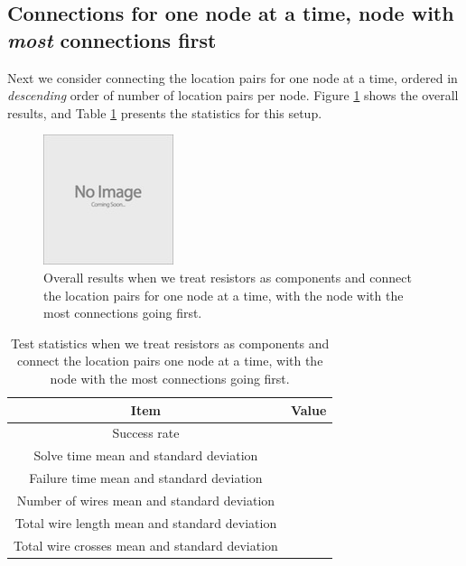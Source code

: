 \subsection{Connections for one node at a time, node with \textit{most}
connections first}

Next we consider connecting the location pairs for one node at a time, ordered
in \textit{descending} order of number of location pairs per node. Figure
\ref{fig:as_comp_node_d} shows the overall results, and Table
\ref{tb:as_comp_node_d} presents the statistics for this setup.

\begin{figure}[H]
\begin{center}
\includegraphics{Images/placeholder.jpg}
\caption{Overall results when we treat resistors as components and connect the
location pairs for one node at a time, with the node with the most connections
going first.}
\label{fig:as_comp_node_d}
\end{center}
\end{figure}

\begin{table}[H]
\begin{center}
\begin{singlespace}
\begin{tabular}{| c | c |}
\hline
Item & Value \\
\hline\hline
Success rate & \\
Solve time mean and standard deviation & \\
Failure time mean and standard deviation & \\
Number of wires mean and standard deviation & \\
Total wire length mean and standard deviation & \\
Total wire crosses mean and standard deviation & \\
\hline
\end{tabular}
\end{singlespace}
\end{center}
\label{tb:as_comp_node_d}
\caption{Test statistics when we treat resistors as components and connect the
location pairs one node at a time, with the node with the most connections going
first.}
\end{table}

